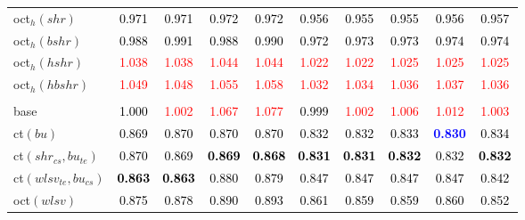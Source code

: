 \begin{tabular}[t]{>{\centering\arraybackslash}m{2.5cm}ccccccccc}
oct$_h(shr)$ & \textcolor{black}{0.971} & \textcolor{black}{0.971} & \textcolor{black}{0.972} & \textcolor{black}{0.972} & \textcolor{black}{0.956} & \textcolor{black}{0.955} & \textcolor{black}{0.955} & \textcolor{black}{0.956} & \textcolor{black}{0.957}\\
oct$_h(bshr)$ & \textcolor{black}{0.988} & \textcolor{black}{0.991} & \textcolor{black}{0.988} & \textcolor{black}{0.990} & \textcolor{black}{0.972} & \textcolor{black}{0.973} & \textcolor{black}{0.973} & \textcolor{black}{0.974} & \textcolor{black}{0.974}\\
oct$_h(hshr)$ & \textcolor{red}{1.038} & \textcolor{red}{1.038} & \textcolor{red}{1.044} & \textcolor{red}{1.044} & \textcolor{red}{1.022} & \textcolor{red}{1.022} & \textcolor{red}{1.025} & \textcolor{red}{1.025} & \textcolor{red}{1.025}\\
oct$_h(hbshr)$ & \textcolor{red}{1.049} & \textcolor{red}{1.048} & \textcolor{red}{1.055} & \textcolor{red}{1.058} & \textcolor{red}{1.032} & \textcolor{red}{1.034} & \textcolor{red}{1.036} & \textcolor{red}{1.037} & \textcolor{red}{1.036}\\
\addlinespace[0.3em]
\multicolumn{10}{c}{\textbf{$k = 2$}}\\
base & \textcolor{black}{1.000} & \textcolor{red}{1.002} & \textcolor{red}{1.067} & \textcolor{red}{1.077} & \textcolor{black}{0.999} & \textcolor{red}{1.002} & \textcolor{red}{1.006} & \textcolor{red}{1.012} & \textcolor{red}{1.003}\\
ct$(bu)$ & \textcolor{black}{0.869} & \textcolor{black}{0.870} & \textcolor{black}{0.870} & \textcolor{black}{0.870} & \textcolor{black}{0.832} & \textcolor{black}{0.832} & \textcolor{black}{0.833} & \textcolor{blue}{\textbf{0.830}} & \textcolor{black}{0.834}\\
ct$(shr_{cs}, bu_{te})$ & \textcolor{black}{0.870} & \textcolor{black}{0.869} & \textcolor{black}{\textbf{0.869}} & \textcolor{black}{\textbf{0.868}} & \textcolor{black}{\textbf{0.831}} & \textcolor{black}{\textbf{0.831}} & \textcolor{black}{\textbf{0.832}} & \textcolor{black}{0.832} & \textcolor{black}{\textbf{0.832}}\\
ct$(wlsv_{te}, bu_{cs})$ & \textcolor{black}{\textbf{0.863}} & \textcolor{black}{\textbf{0.863}} & \textcolor{black}{0.880} & \textcolor{black}{0.879} & \textcolor{black}{0.847} & \textcolor{black}{0.847} & \textcolor{black}{0.847} & \textcolor{black}{0.847} & \textcolor{black}{0.842}\\
oct$(wlsv)$ & \textcolor{black}{0.875} & \textcolor{black}{0.878} & \textcolor{black}{0.890} & \textcolor{black}{0.893} & \textcolor{black}{0.861} & \textcolor{black}{0.859} & \textcolor{black}{0.859} & \textcolor{black}{0.860} & \textcolor{black}{0.852}\\

\end{tabular}
